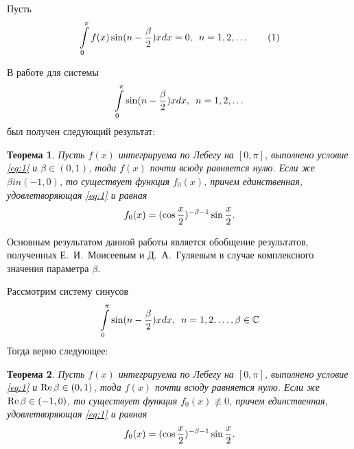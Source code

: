 ﻿\documentclass[oneside, final, 14pt]{extreport}
\newtheorem{theorem}{Теорема}
\begin{document}
Пусть \begin{equation}\int\limits_0^{\pi}f(x)\sin(n - \frac{\beta}{2})xdx = 0, \enspace n = 1, 2, \dots \tag{1} \label{eq:1}\end{equation}

	В работе \cite{moiseev-2018} для системы $$\int\limits_0^{\pi}\sin(n - \frac{\beta}{2})xdx, \enspace n = 1, 2, \dots$$ был получен следующий результат:
	
	\begin{theorem}
		Пусть $f(x)$ интегрируема по Лебегу на $[0, \pi]$, выполнено условие
		\eqref{eq:1} и $\beta \in (0, 1)$, тода $f(x)$ почти всюду равняется нулю. 
		Если же  $\beta in (-1, 0)$, то существует функция $f_0(x)$, причем
		единственная, удовлетворяющая \eqref{eq:1} и равная $$f_0(x) = (\cos\frac{x}{2})^{-\beta-1}\sin\frac{x}{2}.$$
	\end{theorem}
	
	Основным результатом данной работы является обобщение результатов, полученных Е.~И.~Моисеевым 
	и Д.~А.~Гуляевым в случае комплексного значения параметра $\beta$.
	
	
	Рассмотрим систему синусов $$\int\limits_0^{\pi}\sin(n - \frac{\beta}{2})xdx, \enspace n = 1, 2, \dots, \beta\in\mathbb{C}$$
	Тогда верно следующее:
	\begin{theorem}
		Пусть $f(x)$ интегрируема по Лебегу на $[0, \pi]$, выполнено условие
		\eqref{eq:1} и \thinspace $\operatorname{Re}\beta \in (0, 1)$, 
		тода $f(x)$ почти всюду равняется нулю. Если же \thinspace  
		$\operatorname{Re}\beta \in (-1, 0)$, то существует функция $f_0(x) \not\equiv 0$, 
		причем единственная, удовлетворяющая \eqref{eq:1} и равная $$f_0(x) = (\cos\frac{x}{2})^{-\beta-1}\sin\frac{x}{2}.$$
	\end{theorem}
	
\end{document}
